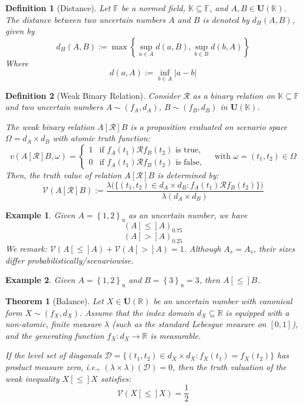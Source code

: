 \documentclass[a4paper,12pt,twoside]{memoir}
\newtheorem{definition}{Definition}[chapter]
\newtheorem{theorem}{Theorem}[chapter]
\newtheorem{example}{Example}[chapter]
\newcommand{\set}[1]{\left\{#1\right\}} %
\newcommand{\s}[1]{\set{#1}_\mathrm{u}} %
\newcommand{\tsbd}[1]{\mathbf{U}(\mathbb{#1})}
\newcommand{\ddclmd}{\mathcal{V}} %
\begin{document}
	\begin{definition}[Distance]
		Let $\mathbb{F}$ be a normed field, $\mathbb{K} \subseteq \mathbb{F}$, and $A, B \in \tsbd{K}$. The distance between two uncertain numbers $A$ and $B$ is denoted by $d_H(A,B)$, given by
		$$
		d_H(A,B) := \max\left\{\sup_{a \in A}{d(a,B),\sup_{b \in B}{d(b,A)}}\right\}
		$$
		Where
		$$d(a,A) := \inf_{b\in A}{|a-b|}$$
	\end{definition}
	
	\begin{definition}[Weak Binary Relation]
		Consider $\mathcal{R}$ as a binary relation on $\mathbb{K} \subseteq \mathbb{F}$ and two uncertain numbers $A \sim (f_A, d_A)$, $B \sim (f_B, d_B)$ in $\mathbf{U}(\mathbb{K})$.
		
		The weak binary relation $A [\mathcal{R}] B$ is a proposition evaluated on scenario space $\Omega = d_A \times d_B$ with atomic truth function:
		\[
		v(A [\mathcal{R}] B, \omega) = \begin{cases}
			1 & \text{if } f_A(t_1) \mathcal{R} f_B(t_2) \text{ is true},   \\
			0 & \text{if } f_A(t_1) \mathcal{R} f_B(t_2) \text{ is false},
		\end{cases} \quad \text{with } \omega = (t_1, t_2) \in \Omega
		\]
		Then, the truth value of relation $A [\mathcal{R}] B$ is determined by:
		\[
		\ddclmd(A [\mathcal{R}] B) := \frac{\lambda\big(\{(t_1, t_2) \in d_A \times d_B : f_A(t_1) \mathcal{R} f_B(t_2)\}\big)}{\lambda(d_A \times d_B)}
		\]
	\end{definition}
	
	\begin{example}
		Given $A = \s{1,2}$ as an uncertain number, we have $$(A[\leq] A)_{0.75}$$ $$(A[>]A)_{0.25}$$
		We remark: $\ddclmd(A[\leq] A) + \ddclmd(A[>]A) = 1$. Although $A_s=A_s$, their sizes differ probabilistically/scenariowise.
	\end{example}
	
	\begin{example}
		Given $A = \s{1,2}$ and $B = \s{3} = 3$, then $A [\le] B$.
	\end{example}
	
	\begin{theorem}[Balance]
		\label{thm:balance}
		Let $X \in \tsbd{R}$ be an uncertain number with canonical form $X \sim (f_X, d_X)$. Assume that the index domain $d_X \subseteq \mathbb{R}$ is equipped with a non-atomic, finite measure $\lambda$ (such as the standard Lebesgue measure on $[0, 1]$), and the generating function $f_X: d_X \to \mathbb{R}$ is measurable.
		
		If the level set of diagonals $\mathcal{D} = \{(t_1, t_2) \in d_X \times d_X : f_X(t_1) = f_X(t_2)\}$ has product measure zero, i.e., $(\lambda \times \lambda)(\mathcal{D}) = 0$, then the truth valuation of the weak inequality $X[\le] X$ satisfies:
		\[
		\ddclmd(X[\le] X) = \frac{1}{2}
		\]
	\end{theorem}
	
\end{document}
